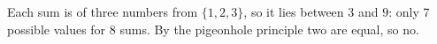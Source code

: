Each sum is of three numbers from $\{1,2,3\}$, so it lies between $3$ and $9$: only $7$ possible values for $8$ sums. By the pigeonhole principle two are equal, so $\boxed{\text{no}}$.
